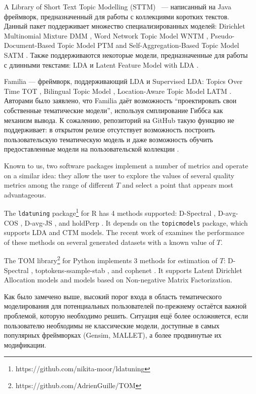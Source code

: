 A Library of Short Text Topic Modelling (STTM) \cite{qiang2018sttm} ~--- написанный на Java фреймворк, предназначенный для работы с коллекциями коротких текстов. Данный пакет поддерживает множество специализированных моделей: Dirichlet Multinomial Mixture DMM \cite{yin2014dirichlet}, Word Network Topic Model WNTM \cite{zuo2016word}, Pseudo-Document-Based Topic Model PTM \cite{zuo2016topic} and Self-Aggregation-Based Topic Model SATM \cite{quan2015short}. Также поддерживаются некоторые модели, предназначенные для работы с длинными текстами: LDA и Latent Feature Model with LDA \cite{nguyen2015improving}.

Familia \cite{jiang2018familia} --- фреймворк, поддерживающий LDA и Supervised LDA: Topics Over Time TOT \cite{wang2006topics}, Bilingual Topic Model \cite{gao2011clickthrough}, Location-Aware Topic Model LATM \cite{wang2007mining}. Авторами было заявлено, что Familia даёт возможность ``проектировать свои собственные тематические модели'', используя смплирование Гиббса как механизм вывода. К сожалению, репозиторий на GitHub такую функцию не поддерживает: в открытом релизе отсутствует возможность построить пользовательскую тематическую модель и даже возможность обучить предоставленные модели на пользовательской коллекции \cite{familia_github}.

Known to us, two software packages implement a number of metrics and operate on a similar idea:  they allow the user to explore the values of several quality metrics among the range of different $T$ and select a point that appears most advantageous.

The \texttt{ldatuning} package\footnote{https://github.com/nikita-moor/ldatuning} for R \cite{ldatuning} has 4 methods supported:  D-Spectral \cite{arun2010finding}, D-avg-COS \cite{cao2009density}, D-avg-JS \cite{deveaud2014accurate}, and holdPerp \cite{griffiths2004finding}. It depends on the \texttt{topicmodels} package, which supports LDA and CTM models. The recent work of \cite{hou2018benchmarking} examines the performance of these methods on several generated datasets with a known value of $T$.

The TOM library\footnote{https://github.com/AdrienGuille/TOM} for Python \cite{guille2016tom} implements 3 methods for estimation of $T$: D-Spectral \cite{arun2010finding}, toptokens-ssample-stab \cite{greene14howmany}, and cophenet \cite{Brunet4164}.  It supports Latent Dirichlet Allocation models and models based on Non-negative Matrix Fac\-tor\-iza\-tion.

Как было замечено выше, высокий порог входа в область тематического моделирования для потенциальных пользователей по-прежнему остаётся важной проблемой, которую необходимо решить. Ситуация ещё более осложняется, если пользователю необходимы не классические модели, доступные в самых популярных фреймворках (Gensim, MALLET), а более продвинутые их модификации.

